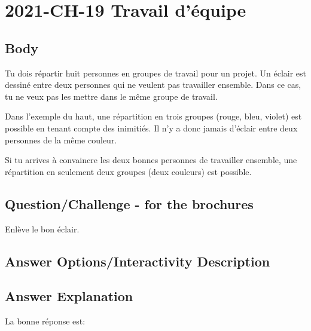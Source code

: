 \documentclass[a4paper,11pt]{report}
\newcommand{\taskGraphicsFolder}{..}
\begin{document}
\section*{\centering{} 2021-CH-19 Travail d’équipe}


\subsection*{Body}

Tu dois répartir huit personnes en groupes de travail pour un projet.
Un éclair est dessiné entre deux personnes qui ne veulent pas travailler ensemble. Dans ce cas, tu ne veux pas les mettre dans le même groupe de travail.

{\centering%
\par}

Dans l’exemple du haut, une répartition en trois groupes (rouge, bleu, violet) est possible en tenant compte des inimitiés. Il n’y a donc jamais d’éclair entre deux personnes de la même couleur.

Si tu arrives à convaincre les deux bonnes personnes de travailler ensemble, une répartition en seulement deux groupes (deux couleurs) est possible.

{\em


\subsection*{Question/Challenge - for the brochures}

Enlève le bon éclair.

{\centering%
\par}

}

\begingroup
\renewcommand{\arraystretch}{1.5}
\subsection*{Answer Options/Interactivity Description}



\endgroup

\subsection*{Answer Explanation}

La bonne réponse est:
\end{document}
